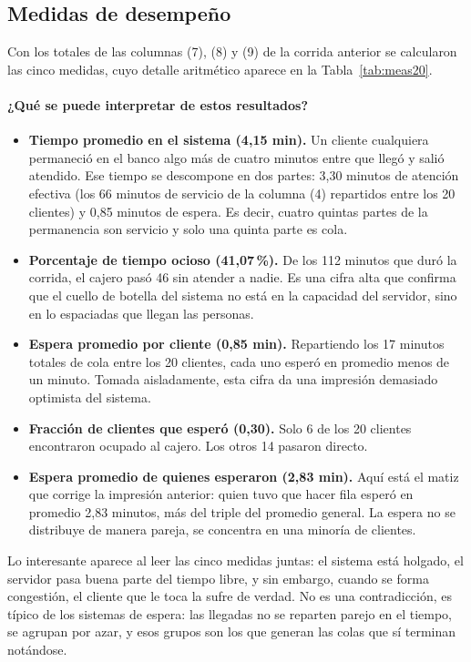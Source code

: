\documentclass[11pt,letterpaper]{article}
\begin{document}
\subsection{Medidas de desempeño}

Con los totales de las columnas (7), (8) y (9) de la corrida anterior se calcularon las cinco medidas, cuyo detalle aritmético aparece en la Tabla~\ref{tab:meas20}.



\paragraph{¿Qué se puede interpretar de estos resultados?}

\begin{itemize}[itemsep=3pt]
    \item \textbf{Tiempo promedio en el sistema (4,15 min).} Un cliente cualquiera permaneció en el banco algo más de cuatro minutos entre que llegó y salió atendido. Ese tiempo se descompone en dos partes: 3,30 minutos de atención efectiva (los 66 minutos de servicio de la columna (4) repartidos entre los 20 clientes) y 0,85 minutos de espera. Es decir, cuatro quintas partes de la permanencia son servicio y solo una quinta parte es cola.
    \item \textbf{Porcentaje de tiempo ocioso (41,07\,\%).} De los 112 minutos que duró la corrida, el cajero pasó 46 sin atender a nadie. Es una cifra alta que confirma que el cuello de botella del sistema no está en la capacidad del servidor, sino en lo espaciadas que llegan las personas.
    \item \textbf{Espera promedio por cliente (0,85 min).} Repartiendo los 17 minutos totales de cola entre los 20 clientes, cada uno esperó en promedio menos de un minuto. Tomada aisladamente, esta cifra da una impresión demasiado optimista del sistema.
    \item \textbf{Fracción de clientes que esperó (0,30).} Solo 6 de los 20 clientes encontraron ocupado al cajero. Los otros 14 pasaron directo.
    \item \textbf{Espera promedio de quienes esperaron (2,83 min).} Aquí está el matiz que corrige la impresión anterior: quien tuvo que hacer fila esperó en promedio 2,83 minutos, más del triple del promedio general. La espera no se distribuye de manera pareja, se concentra en una minoría de clientes.
\end{itemize}

Lo interesante aparece al leer las cinco medidas juntas: el sistema está holgado, el servidor pasa buena parte del tiempo libre, y sin embargo, cuando se forma congestión, el cliente que le toca la sufre de verdad. No es una contradicción, es típico de los sistemas de espera: las llegadas no se reparten parejo en el tiempo, se agrupan por azar, y esos grupos son los que generan las colas que sí terminan notándose.
\end{document}
